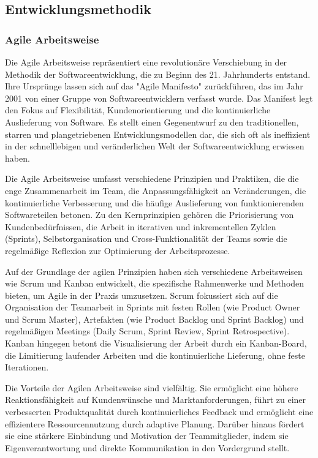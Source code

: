 \documentclass[../main.tex]{subfiles}
\begin{document}
\subsection{Entwicklungsmethodik} %
\subsubsection{Agile Arbeitsweise}
Die Agile Arbeitsweise repräsentiert eine revolutionäre Verschiebung in der Methodik der Softwareentwicklung, die zu Beginn des 21. 
Jahrhunderts entstand. Ihre Ursprünge lassen sich auf das "Agile Manifesto" zurückführen, das im Jahr 2001 von einer Gruppe von 
Softwareentwicklern verfasst wurde. Das Manifest legt den Fokus auf Flexibilität, Kundenorientierung und die kontinuierliche Auslieferung 
von Software. Es stellt einen Gegenentwurf zu den traditionellen, starren und plangetriebenen Entwicklungsmodellen dar, die sich oft als 
ineffizient in der schnelllebigen und veränderlichen Welt der Softwareentwicklung erwiesen haben.

Die Agile Arbeitsweise umfasst verschiedene Prinzipien und Praktiken, die die enge Zusammenarbeit im Team, die Anpassungsfähigkeit an 
Veränderungen, die kontinuierliche Verbesserung und die häufige Auslieferung von funktionierenden Softwareteilen betonen. Zu den 
Kernprinzipien gehören die Priorisierung von Kundenbedürfnissen, die Arbeit in iterativen und inkrementellen Zyklen (Sprints), 
Selbstorganisation und Cross-Funktionalität der Teams sowie die regelmäßige Reflexion zur Optimierung der Arbeitsprozesse.

Auf der Grundlage der agilen Prinzipien haben sich verschiedene Arbeitsweisen wie Scrum und Kanban entwickelt, die spezifische 
Rahmenwerke und Methoden bieten, um Agile in der Praxis umzusetzen. Scrum fokussiert sich auf die Organisation der Teamarbeit in 
Sprints mit festen Rollen (wie Product Owner und Scrum Master), Artefakten (wie Product Backlog und Sprint Backlog) und regelmäßigen 
Meetings (Daily Scrum, Sprint Review, Sprint Retrospective). Kanban hingegen betont die Visualisierung der Arbeit durch ein Kanban-Board, 
die Limitierung laufender Arbeiten und die kontinuierliche Lieferung, ohne feste Iterationen.

Die Vorteile der Agilen Arbeitsweise sind vielfältig. Sie ermöglicht eine höhere Reaktionsfähigkeit auf Kundenwünsche und Marktanforderungen, 
führt zu einer verbesserten Produktqualität durch kontinuierliches Feedback und ermöglicht eine effizientere Ressourcennutzung durch adaptive 
Planung. Darüber hinaus fördert sie eine stärkere Einbindung und Motivation der Teammitglieder, indem sie Eigenverantwortung und direkte 
Kommunikation in den Vordergrund stellt.
\end{document}
